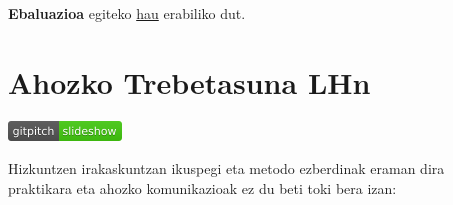 \documentclass[]{book}
\begin{document}
\textbf{Ebaluazioa} egiteko \href{http://evirtual.uaslp.mx/FCQ/estrategias/Material\%20de\%20Apoyo/cat_rubrica.pdf}{hau} erabiliko dut.

\hypertarget{ahozko-trebetasuna-lhn}{%
\chapter{Ahozko Trebetasuna LHn}\label{ahozko-trebetasuna-lhn}}

\href{../Diapoak/03_Diap-ahozko_trebetasunak.html}{\includegraphics{assets/badge.png}}

Hizkuntzen irakaskuntzan ikuspegi eta metodo ezberdinak eraman dira
praktikara eta ahozko komunikazioak ez du beti toki bera izan:
\end{document}
